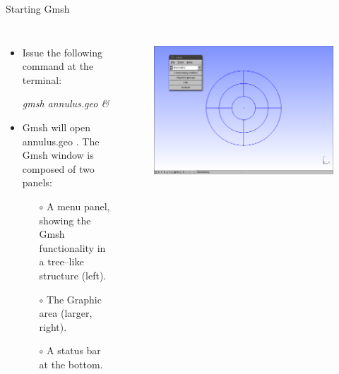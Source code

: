 \documentclass[t]{beamer}
\begin{document}
\begin{frame}{Starting Gmsh}
\vspace{-18pt}
\begin{columns}[l]
\column{2.3in}
  \begin{itemize} 
     \item Issue the following command at the terminal:\\[10pt]
     \item[] \emph{gmsh annulus.geo \&}\\[10pt]
     \item Gmsh will open annulus.geo . The Gmsh window is composed of two panels:
     \begin{itemize}
        \item[$\circ$] A menu panel, showing the Gmsh functionality in a tree--like structure (left).
        \item[$\circ$] The Graphic area (larger, right).
        \item[$\circ$] A status bar at the bottom.
     \end{itemize}
  \end{itemize}
\column{2.2in}
\begin{figure}[htbp!]
 \centering
  \includegraphics[width=1.0\textwidth]{../figures/annulus1}
  \label{fig:annulus1}
\end{figure}
\end{columns}
\end{frame}
\end{document}
